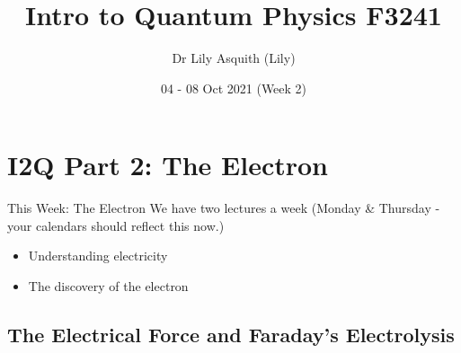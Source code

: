 


% 
\title[ Intro to Quantum Physics]{Intro to Quantum Physics F3241}
\author[Dr Lily Asquith (Lily)]{ Dr Lily Asquith (Lily)}
\date[04 - 08 Oct 2021]{ 04 - 08 Oct 2021 (Week 2)}





\begin{frame}
\titlepage
\end{frame} 

\section{I2Q Part 2: The Electron}

 
 



\begin{frame}{This Week: The Electron}
\small
We have two lectures a week (Monday \& Thursday - your calendars should reflect this now.)\\[1ex]
\begin{itemize}
\item Understanding electricity
\item The discovery of the electron
\end{itemize}
\end{frame}




 \subsection{The Electrical Force and Faraday's Electrolysis}

